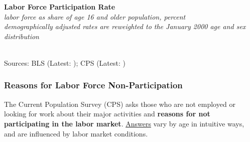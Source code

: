 \documentclass{report}
\makeatletter
\newcommand{\tbllink}[1]{\href{https://raw.githubusercontent.com/bdecon/US-chartbook/master/chartbook/data/#1}{\faTable}}
\newcommand*\short[1]{\expandafter\@gobbletwo\number\numexpr#1\relax}
\newcommand{\absnode}[3]{\node[below right, align=left] at (axis cs: #1,#2) {#3};}
\newcommand{\dateaxisticks}{
		date coordinates in=x, axis line style={draw=none},
		xmax={2022-10-31},
		max space between ticks=40,	    
		xtick={{1990-01-01}, {1992-01-01}, {1994-01-01}, 
			{1996-01-01}, {1998-01-01}, {2000-01-01}, 
			{2002-01-01}, {2004-01-01}, {2006-01-01},
			{2008-01-01}, {2010-01-01}, {2012-01-01}, {2014-01-01},
		    {2016-01-01}, {2018-01-01}, {2020-01-01}, {2022-01-01}, 
		    {2024-01-01}, {2026-01-01}},
		minor xtick={{1989-01-01}, {1991-01-01}, {1993-01-01},
			{1995-01-01}, {1997-01-01}, {1999-01-01}, 
			{2001-01-01}, {2003-01-01}, {2005-01-01}, {2007-01-01},
		    {2009-01-01}, {2011-01-01}, {2013-01-01}, {2015-01-01},
		    {2017-01-01}, {2019-01-01}, {2021-01-01}, {2023-01-01}, 
		    {2025-01-01}, {2027-01-01}},
		enlarge y limits={0.06}, enlarge x limits={0.01},
		}
\newcommand{\bbar}[2]{extra #1 ticks = {{#2}}, extra #1 tick labels = ,
		extra #1 tick style = {grid=major, grid style={thick, black!25}},}
\newcommand{\stdline}[4]{\addplot[very thick, no markers, color=#1] 
		table [x=#2, y=#3, col sep=comma] {#4};	}
\newcommand{\rbars}{
		\fill[color=black!10] (axis cs:{1990-07-01},\pgfkeysvalueof{/pgfplots/ymin}) rectangle 
			(axis cs:{1991-03-01}, \pgfkeysvalueof{/pgfplots/ymax});
		\fill[color=black!10] (axis cs:{2007-12-01},\pgfkeysvalueof{/pgfplots/ymin}) rectangle 
			(axis cs:{2009-07-01}, \pgfkeysvalueof{/pgfplots/ymax});
		\fill[color=black!10] (axis cs:{2001-03-01},\pgfkeysvalueof{/pgfplots/ymin}) rectangle 
			(axis cs:{2001-11-01}, \pgfkeysvalueof{/pgfplots/ymax});
		\fill[color=black!10] (axis cs:{2020-02-01},\pgfkeysvalueof{/pgfplots/ymin}) rectangle 
			(axis cs:{2020-05-01}, \pgfkeysvalueof{/pgfplots/ymax});}
\makeatother
\begin{document}
{\begin{minipage}{0.76\textwidth}
\normalsize \textbf{Labor Force Participation Rate}\\
\footnotesize{\textit{labor force as share of age 16 and older population, percent\\demographically adjusted rates are reweighted to the January 2000 age and sex distribution}}\\
\hspace*{-2mm} \\
\footnotesize{Sources: BLS (Latest: \unskip); CPS (Latest: \unskip)} \hfill \tbllink{lfpr.csv}
\end{minipage}
\newpage
\begin{minipage}{0.76\textwidth}
\subsubsection*{Reasons for Labor Force Non-Participation}
\vspace{-0.5mm}

\small The Current Population Survey (CPS) asks those who are not employed or looking for work about their major activities and \textbf{reasons for not participating in the labor market}. \href{https://www.frbatlanta.org/chcs/human-capital-currents/2015/0612-measuring-labor-market-status-using-basic-data.aspx}{Answers} vary by age in intuitive ways, and are influenced by labor market conditions. 
\end{minipage}

}
\end{document}
